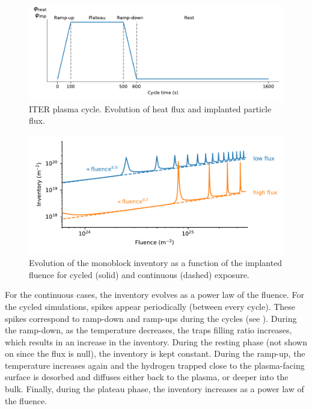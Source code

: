\begin{figure}
    \centering
    \includegraphics[width=\linewidth]{Figures/Chapter3/monoblocks/cycle.pdf}
    \caption{ITER plasma cycle. Evolution of heat flux and implanted particle flux.}
\end{figure}

\begin{figure}
    \centering
    \includegraphics[width=\linewidth]{Figures/Chapter3/monoblocks/comparison_inventory_cycling.pdf}
    \caption{Evolution of the monoblock inventory as a function of the implanted fluence for cycled (solid) and continuous (dashed) exposure.}
\end{figure}

For the continuous cases, the inventory evolves as a power law of the fluence.
For the cycled simulations, spikes appear periodically (between every cycle).
These spikes correspond to ramp-down and ramp-ups during the cycles (see ).
During the ramp-down, as the temperature decreases, the traps filling ratio increases, which results in an increase in the inventory.
During the resting phase (not shown on  since the flux is null), the inventory is kept constant.
During the ramp-up, the temperature increases again and the hydrogen trapped close to the plasma-facing surface is desorbed and diffuses either back to the plasma, or deeper into the bulk.
Finally, during the plateau phase, the inventory increases as a power law of the fluence.

